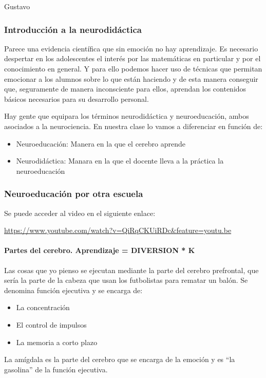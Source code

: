 \begin{opin}{\guscolor}{Gustavo}

\subsubsection{Introducción a la neurodidáctica}

Parece una evidencia científica que sin emoción no hay aprendizaje. Es necesario despertar en los adolescentes el interés por las matemáticas en particular y por el conocimiento en general. Y para ello podemos hacer uso de técnicas que permitan emocionar a los alumnos sobre lo que están haciendo y de esta manera conseguir que, seguramente de manera inconsciente para ellos, aprendan los contenidos básicos necesarios para su desarrollo personal.


Hay gente que equipara los términos neurodidáctica y neuroeducación, ambos asociados a la neurociencia. En nuestra clase lo vamos a diferenciar en función de:

\begin{itemize}
\item Neuroeducación: Manera en la que el cerebro aprende
\item Neurodidáctica: Manara en la que el docente lleva a la práctica la neuroeducación
\end{itemize}

\subsubsection{Neuroeducación por otra escuela}

Se puede acceder al video en el siguiente enlace:

\href{https://www.youtube.com/watch?v=QiRqCKUiRDc\&feature=youtu.be}{https://www.youtube.com/watch?v=QiRqCKUiRDc\&feature=youtu.be}
\paragraph{Partes del cerebro. Aprendizaje =  DIVERSION * K}
Las cosas que yo pienso \textmd{se ejecutan} mediante la parte del cerebro prefrontal, que sería la parte de la cabeza que usan los futbolistas para rematar un balón. Se denomina función ejecutiva y se encarga de:
\begin{itemize}
\item La concentración
\item El control de impulsos
\item La memoria a corto plazo
\end{itemize}
La amígdala es la parte del cerebro que se encarga de la emoción y es “la gasolina” de la función ejecutiva.



\end{opin}
